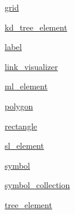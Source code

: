 \begin{DoxyCompactItemize}
\item 
 \mbox{\hyperlink{namespacebridges_1_1grid}{grid}}
\item 
 \mbox{\hyperlink{namespacebridges_1_1kd__tree__element}{kd\+\_\+tree\+\_\+element}}
\item 
 \mbox{\hyperlink{namespacebridges_1_1label}{label}}
\item 
 \mbox{\hyperlink{namespacebridges_1_1link__visualizer}{link\+\_\+visualizer}}
\item 
 \mbox{\hyperlink{namespacebridges_1_1ml__element}{ml\+\_\+element}}
\item 
 \mbox{\hyperlink{namespacebridges_1_1polygon}{polygon}}
\item 
 \mbox{\hyperlink{namespacebridges_1_1rectangle}{rectangle}}
\item 
 \mbox{\hyperlink{namespacebridges_1_1sl__element}{sl\+\_\+element}}
\item 
 \mbox{\hyperlink{namespacebridges_1_1symbol}{symbol}}
\item 
 \mbox{\hyperlink{namespacebridges_1_1symbol__collection}{symbol\+\_\+collection}}
\item 
 \mbox{\hyperlink{namespacebridges_1_1tree__element}{tree\+\_\+element}}
\end{DoxyCompactItemize}
